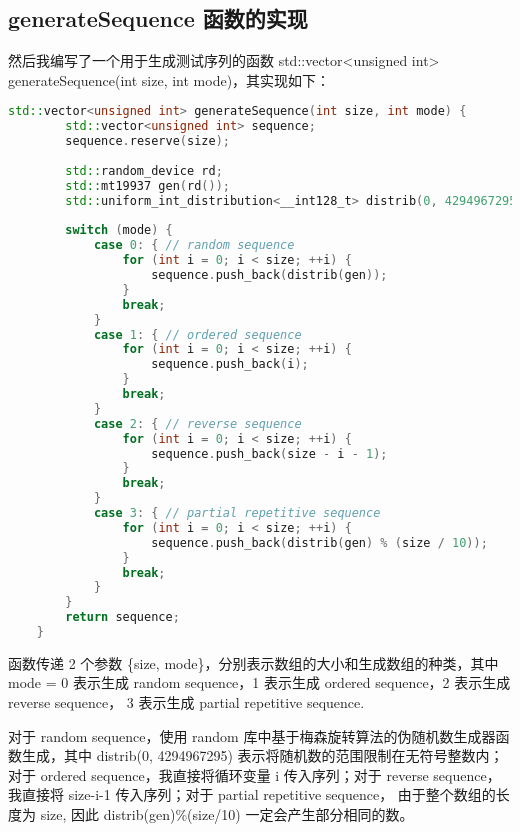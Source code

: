 \documentclass[UTF8]{ctexart}
\begin{document}
\subsection{generateSequence 函数的实现}
然后我编写了一个用于生成测试序列的函数 std::vector<unsigned int> generateSequence(int size, int mode)，其实现如下：
\begin{lstlisting}[language=c++, breaklines=true, keywordstyle=\color{blue!70}, commentstyle=\color{red!50!green!50!blue!50}, frame=shadowbox, rulesepcolor=\color{red!20!green!20!blue!20}]
    std::vector<unsigned int> generateSequence(int size, int mode) {
        std::vector<unsigned int> sequence;
        sequence.reserve(size);
    
        std::random_device rd; 
        std::mt19937 gen(rd()); 
        std::uniform_int_distribution<__int128_t> distrib(0, 4294967295);
    
        switch (mode) {
            case 0: { // random sequence
                for (int i = 0; i < size; ++i) {
                    sequence.push_back(distrib(gen));
                }
                break;
            }
            case 1: { // ordered sequence
                for (int i = 0; i < size; ++i) {
                    sequence.push_back(i);
                }
                break;
            }
            case 2: { // reverse sequence
                for (int i = 0; i < size; ++i) {
                    sequence.push_back(size - i - 1);
                }
                break;
            }
            case 3: { // partial repetitive sequence
                for (int i = 0; i < size; ++i) {
                    sequence.push_back(distrib(gen) % (size / 10));
                }
                break;
            }
        }
        return sequence;
    }
\end{lstlisting}

函数传递 2 个参数 \{size, mode\}，分别表示数组的大小和生成数组的种类，其中 mode = 0 
表示生成 random sequence，1 表示生成 ordered sequence，2 表示生成 reverse sequence，
3 表示生成 partial repetitive sequence. 

对于 random sequence，使用 random 库中基于梅森旋转算法的伪随机数生成器函数生成，其中 distrib(0, 4294967295) 表示将随机数的范围限制在无符号整数内；
对于 ordered sequence，我直接将循环变量 i 传入序列；对于 reverse sequence，我直接将 size-i-1 传入序列；对于 partial repetitive sequence，
由于整个数组的长度为 size, 因此 distrib(gen)\%(size/10) 一定会产生部分相同的数。
\end{document}

